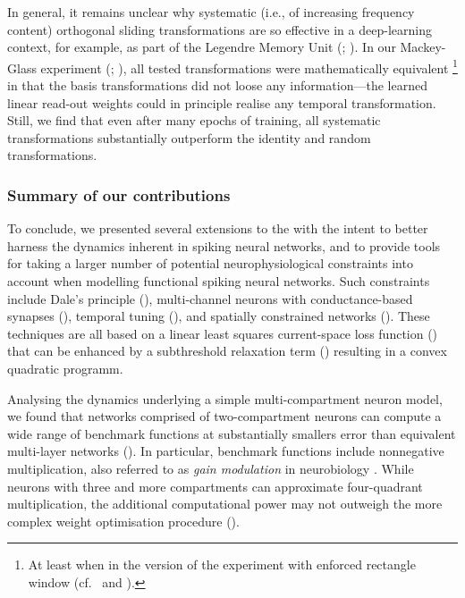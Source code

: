 In general, it remains unclear why systematic (i.e., of increasing frequency content) orthogonal sliding transformations are so effective in a deep-learning context, for example, as part of the Legendre Memory Unit (\LMU; \cite{voelker2019lmu}).
In our Mackey-Glass experiment (; ), all tested transformations were mathematically equivalent%
\footnote{At least when in the version of the experiment with enforced rectangle window (cf.~ and ).}
in that the basis transformations did not loose any information---the learned linear read-out weights could in principle realise any temporal transformation.
Still, we find that even after many epochs of training, all systematic transformations substantially outperform the identity and random transformations.

\subsubsection{Summary of our contributions}

To conclude, we presented several extensions to the \NEF with the intent to better harness the dynamics inherent in spiking neural networks, and to provide tools for taking a larger number of potential neurophysiological constraints into account when modelling functional spiking neural networks.
Such constraints include Dale's principle (), multi-channel neurons with conductance-based synapses (), temporal tuning (), and spatially constrained networks ().
These techniques are all based on a linear least squares current-space loss function () that can be enhanced by a subthreshold relaxation term () resulting in a convex quadratic programm.

Analysing the dynamics underlying a simple multi-compartment neuron model, we found that networks comprised of two-compartment neurons can compute a wide range of benchmark functions at substantially smallers error than equivalent multi-layer networks ().
In particular, benchmark functions include nonnegative multiplication, also referred to as \emph{gain modulation} in neurobiology \citep{salinas2000gain}.
While neurons with three and more compartments can approximate four-quadrant multiplication, the additional computational power may not outweigh the more complex weight optimisation procedure ().

